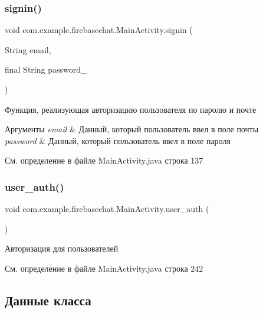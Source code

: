 \subsubsection{\texorpdfstring{signin()}{signin()}}
{\footnotesize\ttfamily void com.\+example.\+firebasechat.\+Main\+Activity.\+signin (\begin{DoxyParamCaption}\item[{String}]{email,  }\item[{final String}]{password\+\_\+ }\end{DoxyParamCaption})}



Функция, реализующая авторизацию пользователя по паролю и почте 


\begin{DoxyParams}{Аргументы}
{\em email} & Данный, который пользователь ввел в поле почты \\
\hline
{\em password} & Данный, который пользователь ввел в поле пароля \\
\hline
\end{DoxyParams}


См. определение в файле Main\+Activity.\+java строка 137

\mbox{\label{classcom_1_1example_1_1firebasechat_1_1_main_activity_a4cc4577677e01c9c0898ab0aaa07d670}} 
\subsubsection{\texorpdfstring{user\+\_\+auth()}{user\_auth()}}
{\footnotesize\ttfamily void com.\+example.\+firebasechat.\+Main\+Activity.\+user\+\_\+auth (\begin{DoxyParamCaption}{ }\end{DoxyParamCaption})}



Авторизация для пользователей 



См. определение в файле Main\+Activity.\+java строка 242



\subsection{Данные класса}
\mbox{\label{classcom_1_1example_1_1firebasechat_1_1_main_activity_a139972aaf697b18799afeede7a832bc0}} 
